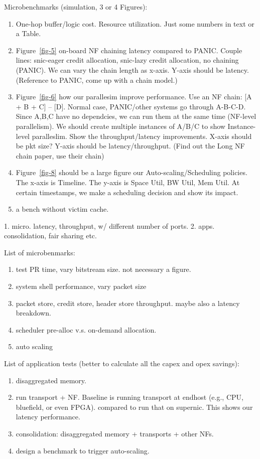 Microbenchmarks (simulation, 3 or 4 Figures):
\begin{enumerate}
    \item One-hop buffer/logic cost. Resource utilization. Just some numbers in text or a Table.
    \item Figure~\ref{fig-5} on-board NF chaining latency compared to PANIC. Couple lines: snic-eager credit allocation, snic-lazy credit allocation, no chaining (PANIC). We can vary the chain length as x-axis. Y-axis should be latency. (Reference to PANIC, come up with a chain model.)
    \item Figure~\ref{fig-6} how our parallesim improve performance. Use an NF chain: [A + B + C] -- [D]. Normal case, PANIC/other systems go through A-B-C-D. Since A,B,C have no dependcies, we can run them at the same time (NF-level parallelism). We should create multiple instances of A/B/C to show Instance-level paralleslim. Show the throughput/latency improvements. X-axis should be pkt size? Y-axis should be latency/throughput. (Find out the Long NF chain paper, use their chain)
    \item Figure~\ref{fig-8} should be a large figure our Auto-scaling/Scheduling policies. The x-axis is Timeline. The y-axis is Space Util, BW Util, Mem Util. At certain timestamps, we make a scheduling decision and show its impact.
    \item a bench without victim cache.
\end{enumerate}

1. micro. latency, throughput, w/ different number of ports.
2. apps. consolidation, fair sharing etc.

List of microbenmarks:
\begin{enumerate}
    \item test PR time, vary bitstream size. not necessary a figure.
    \item system shell performance, vary packet size
    \item packet store, credit store, header store throughput. maybe also a latency breakdown.
    \item scheduler pre-alloc v.s. on-demand allocation.
    \item auto scaling
\end{enumerate}

List of application tests (better to calculate all the capex and opex savings):
\begin{enumerate}
    \item disaggregated memory.
    \item run transport + NF. Baseline is running transport at endhost (e.g., CPU, bluefield, or even FPGA). compared to run that on supernic. This shows our latency performance.
    \item consolidation: disaggregated memory + transports + other NFs.
    \item design a benchmark to trigger auto-scaling.
\end{enumerate}

\fi

